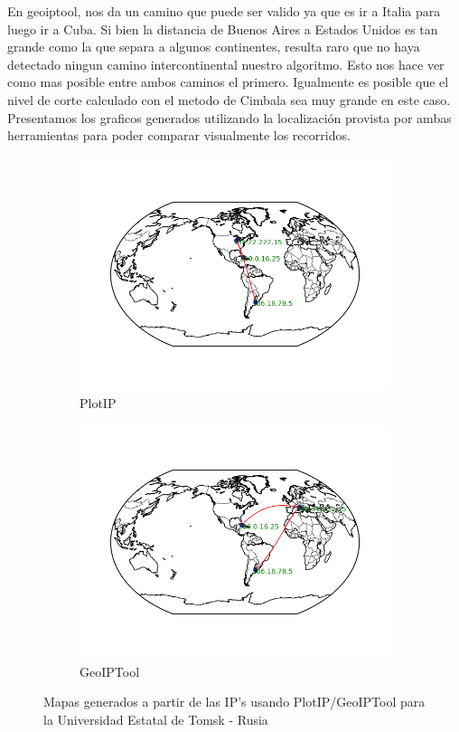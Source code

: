 En geoiptool, nos da un camino que puede ser valido ya que es ir a Italia para luego ir a Cuba. Si bien la distancia de Buenos Aires a Estados Unidos es tan grande como la que separa a algunos continentes, resulta raro que no haya detectado ningun camino intercontinental nuestro algoritmo. Esto nos hace ver como mas posible entre ambos caminos el primero. Igualmente es posible que el nivel de corte calculado con el metodo de Cimbala sea muy grande en este caso.\\

Presentamos los graficos generados utilizando la localizaci\'on provista por ambas herramientas para poder comparar visualmente los recorridos.

\begin{figure}[ht]
	\begin{subfigure}[b]{0.5\textwidth}
		\centering
		\includegraphics[width=\linewidth]{imagenes/mapa_cuba_2.png}
		\caption{PlotIP}
	\end{subfigure} 
	\begin{subfigure}[b]{0.5\textwidth}
		\centering
		\includegraphics[width=\linewidth]{imagenes/mapa_cuba_1.png}
		\caption{GeoIPTool}
	\end{subfigure} 
	\caption{Mapas generados a partir de las IP's usando PlotIP/GeoIPTool para la Universidad Estatal de Tomsk - Rusia}
\end{figure}

